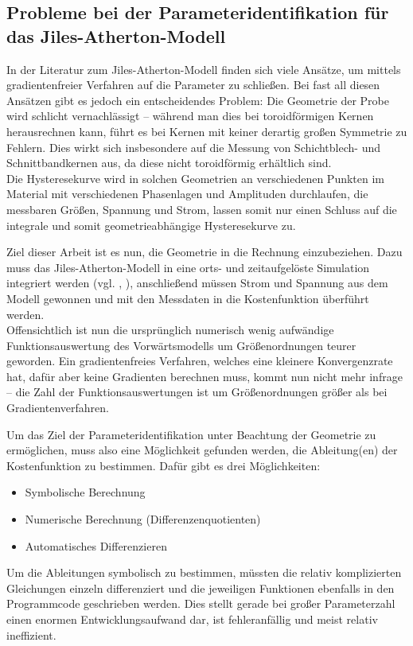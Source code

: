 \documentclass{scrartcl}
\begin{document}
\subsection{Probleme bei der Parameteridentifikation für das Jiles-Atherton-Modell}
In der Literatur zum Jiles-Atherton-Modell finden sich viele Ansätze, um mittels gradientenfreier Verfahren auf die Parameter zu schließen. Bei fast all diesen Ansätzen gibt es jedoch ein entscheidendes Problem: Die Geometrie der Probe wird schlicht vernachlässigt -- während man dies bei toroidförmigen Kernen herausrechnen kann, führt es bei Kernen mit keiner derartig großen Symmetrie zu Fehlern. Dies wirkt sich insbesondere auf die Messung von Schichtblech- und Schnittbandkernen aus, da diese nicht toroidförmig erhältlich sind.\\
Die Hysteresekurve wird in solchen Geometrien an verschiedenen Punkten im Material mit verschiedenen Phasenlagen und Amplituden durchlaufen, die messbaren Größen, Spannung und Strom, lassen somit nur einen Schluss auf die integrale und somit geometrieabhängige Hysteresekurve zu.\par
Ziel dieser Arbeit ist es nun, die Geometrie in die Rechnung einzubeziehen. Dazu muss das Jiles-Atherton-Modell in eine orts- und zeitaufgelöste Simulation integriert werden (vgl. \cite{sadowski}, \cite{Bergqvist}), anschließend müssen Strom und Spannung aus dem Modell gewonnen und mit den Messdaten in die Kostenfunktion überführt werden.\\
Offensichtlich ist nun die ursprünglich numerisch wenig aufwändige Funktionsauswertung des Vorwärtsmodells um Größenordnungen teurer geworden. Ein gradientenfreies Verfahren, welches eine kleinere Konvergenzrate hat, dafür aber keine Gradienten berechnen muss, kommt nun nicht mehr infrage -- die Zahl der Funktionsauswertungen ist um Größenordnungen größer als bei Gradientenverfahren.\par
Um das Ziel der Parameteridentifikation unter Beachtung der Geometrie zu ermöglichen, muss also eine Möglichkeit gefunden werden, die Ableitung(en) der Kostenfunktion zu bestimmen. Dafür gibt es drei Möglichkeiten:
\begin{itemize}
	\item Symbolische Berechnung
	\item Numerische Berechnung (Differenzenquotienten)
	\item Automatisches Differenzieren
\end{itemize}
Um die Ableitungen symbolisch zu bestimmen, müssten die relativ komplizierten Gleichungen einzeln differenziert und die jeweiligen Funktionen ebenfalls in den Programmcode geschrieben werden. Dies stellt gerade bei großer Parameterzahl einen enormen Entwicklungsaufwand dar, ist fehleranfällig und meist relativ ineffizient.\\
\end{document}

